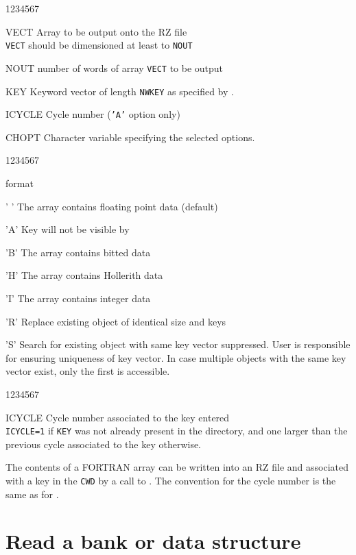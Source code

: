 \Idesc
\begin{DLtt}{1234567}
\item[VECT]Array to be output onto the RZ file\\
{\tt VECT} should be dimensioned at least to {\tt NOUT}
\item[NOUT]number of words of array {\tt VECT} to be output
\item[KEY]Keyword vector of length {\tt NWKEY} as specified by .
\item[ICYCLE]Cycle number ({\tt'A'} option only)
\item[CHOPT]Character variable specifying the selected options.
\begin{DLtt}{1234567}
\item[format]
\begin{DLtt}{12}
\item[' ']The array contains floating point data (default)
\item['A']Key will not be visible by 
\item['B']The array contains bitted data
\item['H']The array contains Hollerith data
\item['I']The array contains integer data
\item['R']Replace existing object of identical size and keys
\item['S']Search for existing object with same key vector suppressed.
User is responsible for ensuring uniqueness of key vector. In case
multiple objects with the same key vector exist, only the first is 
accessible. 
\end{DLtt}
\end{DLtt}
\end{DLtt}
\Odesc
\begin{DLtt}{1234567}
\item[ICYCLE]Cycle number associated to the key entered\\
{\tt ICYCLE=1} if {\tt KEY} was not already present in the directory,
and one larger than the previous cycle associated to the key otherwise.
\end{DLtt}
\par 
The contents of a FORTRAN array can be written
into an RZ file and associated with a key in the {\tt CWD}
by a call to .
The convention for the cycle number is the same as for .

\section{Read a bank or data structure}

